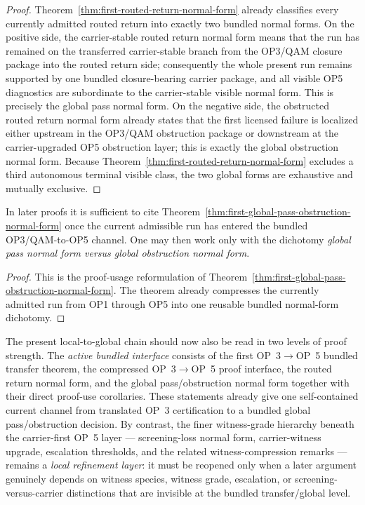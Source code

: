 \begin{proof}
Theorem~\ref{thm:first-routed-return-normal-form} already classifies every currently admitted
routed return into exactly two bundled normal forms. On the positive side, the carrier-stable
routed return normal form means that the run has remained on the transferred carrier-stable
branch from the OP3/QAM closure package into the routed return side; consequently the whole
present run remains supported by one bundled closure-bearing carrier package, and all visible
OP5 diagnostics are subordinate to the carrier-stable visible normal form. This is precisely the
global pass normal form. On the negative side, the obstructed routed return normal form already
states that the first licensed failure is localized either upstream in the OP3/QAM obstruction
package or downstream at the carrier-upgraded OP5 obstruction layer; this is exactly the global
obstruction normal form. Because Theorem~\ref{thm:first-routed-return-normal-form} excludes a
third autonomous terminal visible class, the two global forms are exhaustive and mutually
exclusive.
\end{proof}

\begin{corollary}
\label{cor:global-pass-obstruction-use-rule}
In later proofs it is sufficient to cite Theorem~\ref{thm:first-global-pass-obstruction-normal-form}
once the current admissible run has entered the bundled OP3/QAM-to-OP5 channel. One may then
work only with the dichotomy \emph{global pass normal form versus global obstruction normal
form}.
\end{corollary}

\begin{proof}
This is the proof-usage reformulation of
Theorem~\ref{thm:first-global-pass-obstruction-normal-form}. The theorem already compresses the
currently admitted run from OP1 through OP5 into one reusable bundled normal-form dichotomy.
\end{proof}


\begin{remark}
\label{rem:status-bundled-op3-op5-global-chain}
The present local-to-global chain should now also be read in two levels of proof strength. The \emph{active bundled interface} consists of the first OP~3$\to$OP~5 bundled transfer theorem, the compressed OP~3$\to$OP~5 proof interface, the routed return normal form, and the global pass/obstruction normal form together with their direct proof-use corollaries. These statements already give one self-contained current channel from translated OP~3 certification to a bundled global pass/obstruction decision. By contrast, the finer witness-grade hierarchy beneath the carrier-first OP~5 layer --- screening-loss normal form, carrier-witness upgrade, escalation thresholds, and the related witness-compression remarks --- remains a \emph{local refinement layer}: it must be reopened only when a later argument genuinely depends on witness species, witness grade, escalation, or screening-versus-carrier distinctions that are invisible at the bundled transfer/global level.
\end{remark}

